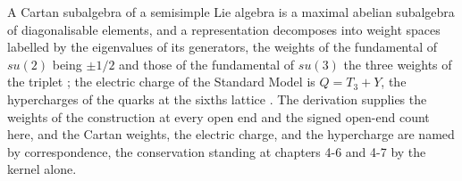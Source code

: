\begin{chbridge}
A Cartan subalgebra of a semisimple Lie algebra is a maximal abelian subalgebra of diagonalisable elements, and a representation decomposes into weight spaces labelled by the eigenvalues of its generators, the weights of the fundamental of $su(2)$ being $\pm 1/2$ and those of the fundamental of $su(3)$ the three weights of the triplet \cite{Humphreys1972}; the electric charge of the Standard Model is $Q = T_3 + Y$, the hypercharges of the quarks at the sixths lattice \cite{GellMannNishijima1953,Weinberg1967}. The derivation supplies the weights of the construction at every open end and the signed open-end count here, and the Cartan weights, the electric charge, and the hypercharge are named by correspondence, the conservation standing at chapters 4-6 and 4-7 by the kernel alone.
\end{chbridge}
